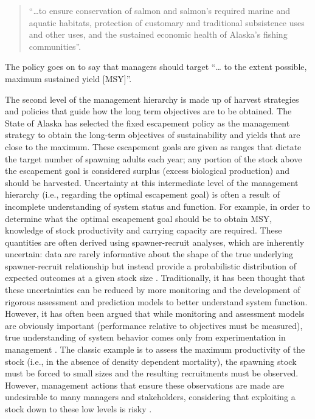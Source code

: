 \documentclass[12pt,]{book}
\theoremstyle{definition}
\theoremstyle{definition}
\theoremstyle{definition}
\theoremstyle{remark}
\begin{document}
\begin{quote}
``\ldots{}to ensure conservation of salmon and salmon's required marine
and aquatic habitats, protection of customary and traditional
subsistence uses and other uses, and the sustained economic health of
Alaska's fishing communities''.
\end{quote}

\noindent
The policy goes on to say that managers should target ``\ldots{} to the
extent possible, maximum sustained yield {[}MSY{]}''.

The second level of the management hierarchy is made up of harvest
strategies and policies that guide how the long term objectives are to
be obtained. The State of Alaska has selected the fixed escapement
policy as the management strategy to obtain the long-term objectives of
sustainability and yields that are close to the maximum. These
escapement goals are given as ranges that dictate the target number of
spawning adults each year; any portion of the stock above the escapement
goal is considered surplus (excess biological production) and should be
harvested. Uncertainty at this intermediate level of the management
hierarchy (i.e., regarding the optimal escapement goal) is often a
result of incomplete understanding of system status and function. For
example, in order to determine what the optimal escapement goal should
be to obtain MSY, knowledge of stock productivity and carrying capacity
are required. These quantities are often derived using spawner-recruit
analyses, which are inherently uncertain: data are rarely informative
about the shape of the true underlying spawner-recruit relationship but
instead provide a probabilistic distribution of expected outcomes at a
given stock size \citep{walters-martell-2004}. Traditionally, it has
been thought that these uncertainties can be reduced by more monitoring
and the development of rigorous assessment and prediction models to
better understand system function. However, it has often been argued
that while monitoring and assessment models are obviously important
(performance relative to objectives must be measured), true
understanding of system behavior comes only from experimentation in
management \citep[the concept of ``active adaptive
management'';][]{walters-1986}. The classic example is to assess the
maximum productivity of the stock (i.e., in the absence of density
dependent mortality), the spawning stock must be forced to small sizes
and the resulting recruitments must be observed. However, management
actions that ensure these observations are made are undesirable to many
managers and stakeholders, considering that exploiting a stock down to
these low levels is risky \citep{walters-1986}.
\end{document}
